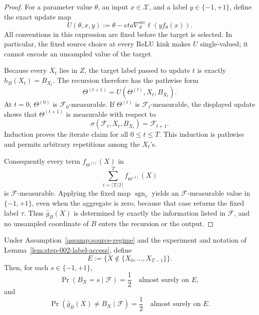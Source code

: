\begin{proof}
For a parameter value $\theta$, an input $x\in\mathcal X$, and a label
$y\in\{-1,+1\}$, define the exact update map
\[
U(\theta,x,y):=\theta-eta\nabla^{\mathrm{src}}_\theta
\ell\!\left(y f_\theta(x)\right).
\]
All conventions in this expression are fixed before the target is selected.
In particular, the fixed source choice at every ReLU kink makes $U$
single-valued; it cannot encode an unsampled value of the target.

Because every $X_t$ lies in $Z$, the target label passed to update $t$ is
exactly $h_B(X_t)=B_{X_t}$.  The recursion therefore has the pathwise form
\[
\Theta^{(t+1)}=U\!\left(\Theta^{(t)},X_t,B_{X_t}\right).
\]
At $t=0$, $\Theta^{(0)}$ is $\mathscr F_0$-measurable.  If
$\Theta^{(t)}$ is $\mathscr F_t$-measurable, the displayed update shows that
$\Theta^{(t+1)}$ is measurable with respect to
\[
\sigma(\mathscr F_t,X_t,B_{X_t})=\mathscr F_{t+1}.
\]
Induction proves the iterate claim for all $0\leq t\leq T$.  This induction
is pathwise and permits arbitrary repetitions among the $X_t$'s.

Consequently every term $f_{\Theta^{(t)}}(X)$ in
\[
\sum_{t=\lceil T/2\rceil}^{T}f_{\Theta^{(t)}}(X)
\]
is $\mathscr F$-measurable.  Applying the fixed map
$\operatorname{sgn}_{\tau}$ yields an $\mathscr F$-measurable value in
$\{-1,+1\}$, even when the aggregate is zero, because that case returns the
fixed label $\tau$.  Thus $\widehat g_B(X)$ is determined by exactly the
information listed in $\mathscr F$, and no unsampled coordinate of $B$ enters
the recursion or the output.
\end{proof}

\begin{lemma}
\label{lem:step-002-unseen-label}
Under Assumption~\ref{assump:source-regime} and the experiment and notation of
Lemma~\ref{lem:step-002-label-access}, define
\[
E:=\{X\notin\{X_0,\ldots,X_{T-1}\}\}.
\]
Then, for each $s\in\{-1,+1\}$,
\[
\Pr(B_X=s\mid\mathscr F)=\frac12
\quad\text{almost surely on }E,
\]
and
\[
\Pr\!\left(\widehat g_B(X)\ne B_X\mid\mathscr F\right)
=\frac12
\quad\text{almost surely on }E.
\]
\end{lemma}

